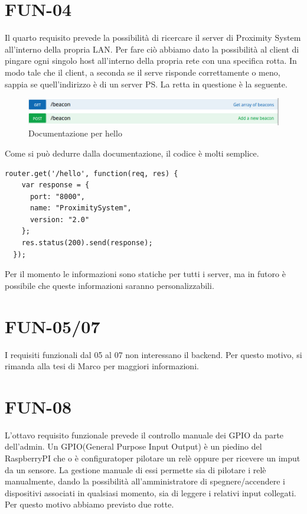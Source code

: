 \section{FUN-04}
Il quarto requisito prevede la possibilità di ricercare il server di Proximity System all'interno della propria LAN.
Per fare ciò abbiamo dato la possibilità al client di pingare ogni singolo host all'interno della propria rete con una specifica rotta.
In modo tale che il client, a seconda se il serve risponde correttamente o meno, sappia se quell'indirizzo è di un server PS.
La retta in questione è la seguente.
\begin{figure}[h]
\centering
\includegraphics[width=1\textwidth]{API/beacon_03.png} 
\caption{Documentazione per hello}
\label{fig:user:login}
\end{figure}
Come si può dedurre dalla documentazione, il codice è molti semplice.
\begin{lstlisting}[caption={/webserver/app/routes/setting.js hello}, style=javaScriptCode]
  router.get('/hello', function(req, res) {
    var response = {
      port: "8000",
      name: "ProximitySystem",
      version: "2.0"
    };
    res.status(200).send(response);
  });
\end{lstlisting}
Per il momento le informazioni sono statiche per tutti i server, ma in futoro è possibile che queste informazioni saranno personalizzabili.

\section{FUN-05/07}
I requisiti funzionali dal 05 al 07 non interessano il backend.
Per questo motivo, si rimanda alla tesi di Marco per maggiori informazioni.
\section{FUN-08}
L'ottavo requisito funzionale prevede il controllo manuale dei GPIO da parte dell'admin.
Un GPIO(General Purpose Input Output) è un piedino del RaspberryPI che o è configuratoper pilotare un relè oppure per ricevere un imput da un sensore.
La gestione manuale di essi permette sia di pilotare i relè manualmente, dando la possibilità all'amministratore di spegnere/accendere i dispositivi associati in qualsiasi momento, sia di leggere i relativi input collegati.
Per questo motivo abbiamo previsto due rotte.

